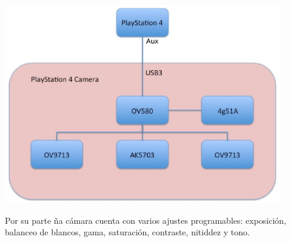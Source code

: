 \begin{minipage}{\linewidth}
    \centering
    \includegraphics[width=0.9\textwidth]{images/cap3/PlaystationCameraDiagrama.eps}
    \label{fig:Playstation-Camera-Diagram}
\end{minipage}

Por su parte ña cámara cuenta con varios ajustes programables: exposición,
balanceo de blancos, gama, saturación, contraste, nitiddez y tono.



